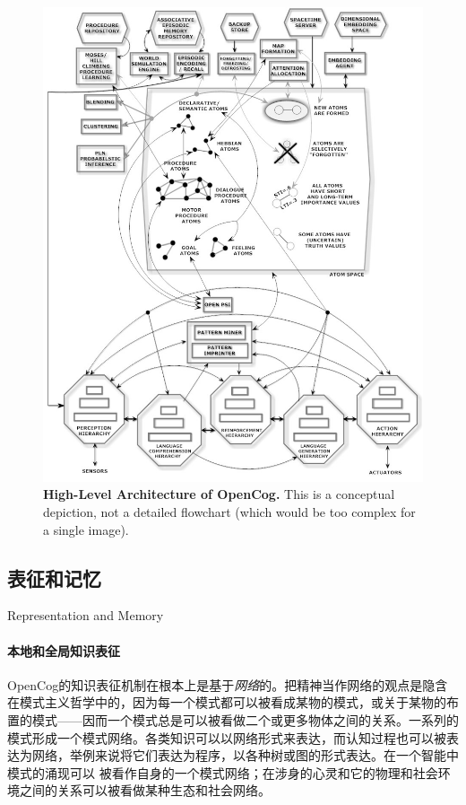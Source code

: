 \begin{figure}[htb]
\centering
\includegraphics[width=14cm]{figures/1.jpg}
\caption{ {\bf High-Level Architecture of OpenCog.}  This is a conceptual depiction, not a detailed flowchart (which would be too complex for a single image).   }
\label{fig:CogPrime1}
\end{figure}

\subsection{表征和记忆}{Representation and Memory}

\paragraph{本地和全局知识表征}

OpenCog的知识表征机制在根本上是基于{\it 网络}的。把精神当作网络的观点是隐含在模式主义哲学中的，因为每一个模式都可以被看成某物的模式，或关于某物的布置的模式——因而一个模式总是可以被看做二个或更多物体之间的关系。一系列的模式形成一个模式网络。各类知识可以以网络形式来表达，而认知过程也可以被表达为网络，举例来说将它们表达为程序，以各种树或图的形式表达。在一个智能中模式的涌现可以 被看作自身的一个模式网络；在涉身的心灵和它的物理和社会环境之间的关系可以被看做某种生态和社会网络。

